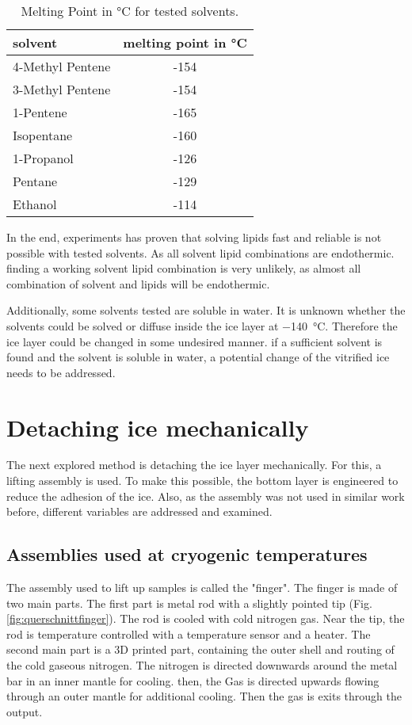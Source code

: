 \begin{table}[hbt!]
	\centering
	\begin{tabular}{|l|c|}
		\hline
		solvent & melting point in °C \\
		\hline
		\hline
		4-Methyl Pentene & -154 \\ 
		\hline
		3-Methyl Pentene & -154 \\
		\hline
		1-Pentene & -165 \\
		\hline
		Isopentane & -160 \\
		\hline
		1-Propanol & -126 \\
		\hline
		Pentane & -129 \\
		\hline
		Ethanol & -114 \\
		\hline
	\end{tabular}
	\caption{Melting Point in °C for tested solvents.}
	\label{table:SchmelztemperaturLösungsmittel}
\end{table}

In the end, experiments has proven that solving lipids fast and reliable is not possible with tested solvents. As all solvent lipid combinations are endothermic. finding a working solvent lipid combination is very unlikely, as almost all combination of solvent and lipids will be endothermic.

Additionally, some solvents tested are soluble in water. It is unknown whether the solvents could be solved or diffuse inside the ice layer at \SI{-140}{\degreeCelsius}. Therefore the ice layer could be changed in some undesired manner. if a sufficient solvent is found and the solvent is soluble in water, a potential change of the vitrified ice needs to be addressed.

\section{Detaching ice mechanically}

The next explored method is detaching the ice layer mechanically. For this, a lifting assembly is used. To make this possible, the bottom layer is engineered to reduce the adhesion of the ice. Also, as the assembly was not used in similar work before, different variables are addressed and examined.  

\subsection{Assemblies used at cryogenic temperatures}

The assembly used to lift up samples is called the "finger". The finger is made of two main parts. The first part is metal rod with a slightly pointed tip (Fig. \ref{fig:querschnittfinger}). The rod is cooled with cold nitrogen gas. Near the tip, the rod is temperature controlled with a temperature sensor and a heater. The second main part is a 3D printed part, containing the outer shell and routing of the cold gaseous nitrogen. The nitrogen is  directed downwards around the metal bar in an inner mantle for cooling. then, the Gas is directed upwards flowing through an outer mantle for additional cooling. Then the gas is exits through the output.

